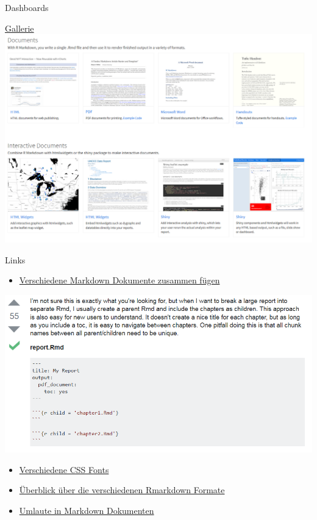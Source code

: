 \documentclass[ignorenonframetext,]{beamer}
\providecommand{\tightlist}{%
\setlength{\itemsep}{0pt}\setlength{\parskip}{0pt}}
\begin{document}
\begin{frame}[fragile]{Dashboards}
\begin{block}{\href{http://rmarkdown.rstudio.com/gallery.html}{Gallerie}}
\includegraphics{./tex2pdf.9796/b5dffb8ef7827951a1fe64eba6c0f919b6b0d353.png}

\end{block}

\begin{block}{Links}

\begin{itemize}
\tightlist
\item
  \href{http://stackoverflow.com/questions/25824795/how-to-combine-two-rmarkdown-rmd-files-into-a-single-output}{Verschiedene
  Markdown Dokumente zusammen fügen}
\end{itemize}

\includegraphics{./tex2pdf.9796/d7a0873ade3c4cb8113d2ab3d45e0d3f5a39b1f1.png}

\begin{itemize}
\item
  \href{http://www.cssfontstack.com/}{Verschiedene CSS Fonts}
\item
  \href{http://rmarkdown.rstudio.com/formats.html}{Überblick über die
  verschiedenen Rmarkdown Formate}
\item
  \href{https://stackoverflow.com/questions/41567549/german-umlauts-in-r-markdown-again}{Umlaute
  in Markdown Dokumenten}
\end{itemize}

\end{block}

\end{frame}
\end{document}
